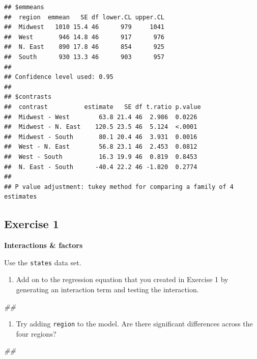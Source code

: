 \documentclass[
]{book}
\newenvironment{Shaded}{\begin{snugshade}}{\end{snugshade}}
\newcommand{\CommentTok}[1]{\textcolor[rgb]{0.56,0.35,0.01}{\textit{#1}}}
\providecommand{\tightlist}{%
  \setlength{\itemsep}{0pt}\setlength{\parskip}{0pt}}
\begin{document}
\begin{verbatim}
## $emmeans
##  region  emmean   SE df lower.CL upper.CL
##  Midwest   1010 15.4 46      979     1041
##  West       946 14.8 46      917      976
##  N. East    890 17.8 46      854      925
##  South      930 13.3 46      903      957
## 
## Confidence level used: 0.95 
## 
## $contrasts
##  contrast          estimate   SE df t.ratio p.value
##  Midwest - West        63.8 21.4 46  2.986  0.0226 
##  Midwest - N. East    120.5 23.5 46  5.124  <.0001 
##  Midwest - South       80.1 20.4 46  3.931  0.0016 
##  West - N. East        56.8 23.1 46  2.453  0.0812 
##  West - South          16.3 19.9 46  0.819  0.8453 
##  N. East - South      -40.4 22.2 46 -1.820  0.2774 
## 
## P value adjustment: tukey method for comparing a family of 4 estimates
\end{verbatim}

\hypertarget{exercise-1-1}{%
\subsection{Exercise 1}\label{exercise-1-1}}

\textbf{Interactions \& factors}

Use the \texttt{states} data set.

\begin{enumerate}
\def\labelenumi{\arabic{enumi}.}
\tightlist
\item
  Add on to the regression equation that you created in Exercise 1 by generating an interaction term and testing the interaction.
\end{enumerate}

\begin{Shaded}
\begin{Highlighting}[]
\CommentTok{\#\# }
\end{Highlighting}
\end{Shaded}

\begin{enumerate}
\def\labelenumi{\arabic{enumi}.}
\setcounter{enumi}{1}
\tightlist
\item
  Try adding \texttt{region} to the model. Are there significant differences across the four regions?
\end{enumerate}

\begin{Shaded}
\begin{Highlighting}[]
\CommentTok{\#\# }
\end{Highlighting}
\end{Shaded}
\end{document}
